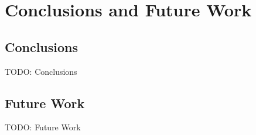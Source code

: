 \chapter{Conclusions and Future Work}

\section{Conclusions}

TODO: Conclusions

\section{Future Work}

TODO: Future Work
